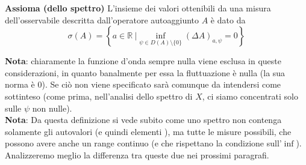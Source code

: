 \documentclass[../../FisicaTeorica.tex]{subfiles}
\begin{document}
\begin{axi}
\textbf{Assioma (dello spettro)}
L'insieme dei valori ottenibili da una misura dell'osservabile descritta dall'operatore autoaggiunto $A$ è dato da 
\begin{equation}
\sigma \left(A\right)= \left\{a\in\mathbb{R}\ |\inf_{\psi\in D\left(A\right)\setminus\{0\}}{\left(\Delta A\right)_{a,\psi}}=0\right\}
\label{eqn:spettroA}
\end{equation}
\end{axi}
\textbf{Nota}: chiaramente la funzione d'onda sempre nulla viene esclusa in queste considerazioni, in quanto banalmente per essa la fluttuazione è nulla (la sua norma è $0$). Se ciò non viene specificato sarà comunque da intendersi come sottinteso (come prima, nell'analisi dello spettro di $X$, ci siamo concentrati solo sulle $\psi$ non nulle).\\
\textbf{Nota}: Da questa definizione si vede subito come uno spettro non contenga solamente gli autovalori (e quindi elementi ), ma tutte le misure possibili, che possono avere anche un range continuo (e che rispettano la condizione sull'$\inf$). Analizzeremo meglio la differenza tra queste due  nei prossimi paragrafi.
\end{document}
